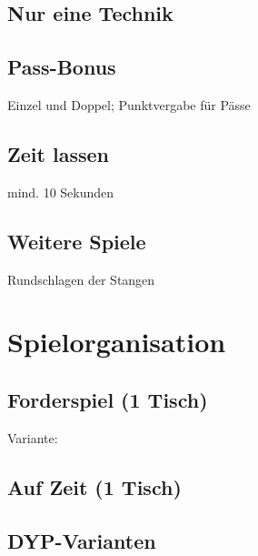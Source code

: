 \subsection{Nur eine Technik}
\label{spielformen:sonderregeln:nureinetechnik}



\subsection{Pass-Bonus}
\label{spielformen:sonderregeln:passbonus}
Einzel und Doppel; Punktvergabe für Pässe

\subsection{Zeit lassen}
\label{spielformen:sonderregeln:zeitlassen}
mind. 10 Sekunden 

\subsection{Weitere Spiele}
\label{spielformen:sonderregeln:weiteres}

Rundschlagen der Stangen

\section{Spielorganisation}

\subsection{Forderspiel (1 Tisch)}

Variante:

\subsection{Auf Zeit (1 Tisch)}

\subsection{DYP-Varianten}

